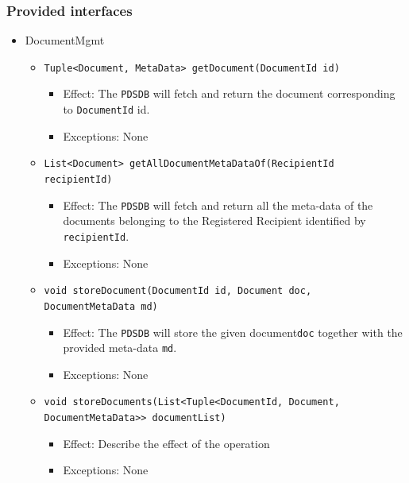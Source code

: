 \documentclass[a4paper,10pt]{article}
\begin{document}
\subsubsection*{Provided interfaces}
\begin{itemize}
    \item DocumentMgmt
    \begin{itemize}
        \item \texttt{Tuple<Document, MetaData> getDocument(DocumentId id)}
        \begin{itemize}
            \item Effect: The \texttt{PDSDB} will fetch and return the document corresponding to \texttt{DocumentId} id.
            \item Exceptions: None
         \end{itemize}
         
         \item \texttt{List<Document> getAllDocumentMetaDataOf(RecipientId recipientId)}
        \begin{itemize}
            \item Effect: The \texttt{PDSDB} will fetch and return all the meta-data of the documents belonging to the Registered Recipient identified by \texttt{recipientId}.
            \item Exceptions: None
         \end{itemize}   
		\item \texttt{void storeDocument(DocumentId id, Document doc, DocumentMetaData md)}
        \begin{itemize}
            \item Effect: The \texttt{PDSDB} will store the given document\texttt{doc} together with the provided meta-data \texttt{md}.
            \item Exceptions:  None 
        \end{itemize}
         
         \item \texttt{void storeDocuments(List<Tuple<DocumentId, Document, DocumentMetaData>> documentList)}
         \begin{itemize}
                \item Effect: Describe the effect of the operation
                \item Exceptions: None   
         \end{itemize}
         

\end{itemize}
\end{itemize}
\end{document}

